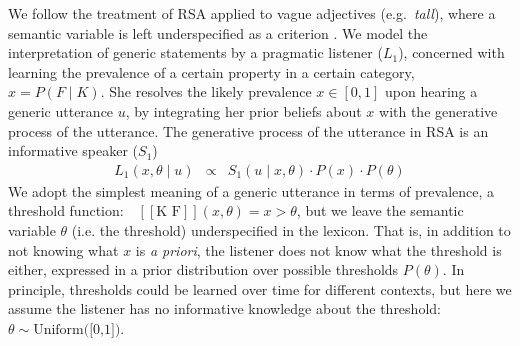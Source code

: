 \documentclass[12pt,letterpaper]{article}
\newcommand{\denote}[1]{\mbox{ $[\![ #1 ]\!]$}}
\begin{document}

We follow the treatment of RSA applied to vague adjectives (e.g.~\emph{tall}), where a semantic variable is left underspecified as a criterion \cite{Lassiter2013,Lassiter2015}.
We model the interpretation of generic statements by a pragmatic listener ($L_1$), concerned with learning the prevalence of a certain property in a certain category, $x=P(F \mid K)$.
She resolves the likely prevalence $x \in [0, 1]$ upon hearing a generic utterance $u$, by integrating her prior beliefs about $x$ with the generative process of the utterance.
The generative process of the utterance in RSA is an informative speaker ($S_1$)
%
\begin{eqnarray}
L_{1}(x , \theta \mid u) &\propto& S_{1}(u \mid x, \theta) \cdot P(x) \cdot P(\theta) \label{eq:L1}
\end{eqnarray}
%
We adopt the simplest meaning of a generic utterance in terms of prevalence, a threshold function: $\denote{\text{K F}}(x, \theta)=x>\theta$, but we leave the semantic variable $\theta$ (i.e. the threshold) underspecified in the lexicon. 
That is, in addition to not knowing what $x$ is \emph{a priori}, the listener does not know what the threshold is either, expressed in a prior distribution over possible thresholds $P(\theta)$.
In principle, thresholds could be learned over time for different contexts, but here we assume the listener has no informative knowledge about the threshold: $\theta \sim \text{Uniform([0,1])}$.
\end{document}
